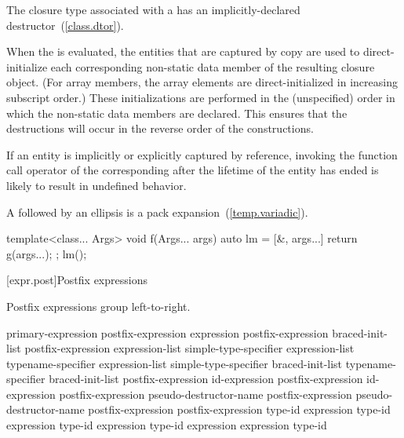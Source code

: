 \pnum
The closure type associated with a  has an
implicitly-declared destructor~(\ref{class.dtor}).

\pnum
When the  is evaluated, the entities that are
captured by copy are used to direct-initialize each corresponding non-static data member
of the resulting closure object. (For array members, the array elements are
direct-initialized in increasing subscript order.) These initializations are performed
in the (unspecified) order in which the non-static data members are declared. \enternote
This ensures that the destructions will occur in the reverse order of the constructions.
\exitnote

\pnum
\enternote If an entity is implicitly or explicitly captured by reference,
invoking the function call operator of the corresponding 
after the lifetime of the entity has ended is likely to result in undefined behavior.
\exitnote

\pnum
A  followed by an ellipsis is a pack expansion~(\ref{temp.variadic}).
\enterexample
\begin{codeblock}
template<class... Args>
void f(Args... args) {
  auto lm = [&, args...] { return g(args...); };
  lm();
}
\end{codeblock}
\exitexample%
%

[expr.post]{Postfix expressions}%

\pnum
Postfix expressions group left-to-right.

\begin{bnf}
\br
    primary-expression\br
    postfix-expression \terminal{[} expression \terminal{]}\br
    postfix-expression \terminal{[} braced-init-list \terminal{]}\br
    postfix-expression \terminal{(} expression-list\opt \terminal{)}\br
    simple-type-specifier \terminal{(} expression-list\opt \terminal{)}\br
    typename-specifier \terminal{(} expression-list\opt \terminal{)}\br
    simple-type-specifier braced-init-list\br
    typename-specifier braced-init-list\br
    postfix-expression \opt id-expression\br
    postfix-expression \opt id-expression\br
    postfix-expression  pseudo-destructor-name\br
    postfix-expression \terminal{->} pseudo-destructor-name\br
    postfix-expression \terminal{++}\br
    postfix-expression \terminal{-{-}}\br
     type-id \terminal{> (} expression \terminal{)}\br
     type-id \terminal{> (} expression \terminal{)}\br
     type-id \terminal{> (} expression \terminal{)}\br
     type-id \terminal{> (} expression \terminal{)}\br
     expression \terminal{)}\br
     type-id \terminal{)}
\end{bnf}


